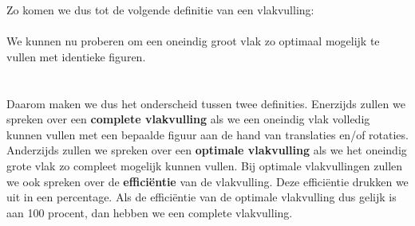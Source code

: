 Zo komen we dus tot de volgende definitie van een vlakvulling:\\
\\
We kunnen nu proberen om een oneindig groot vlak zo optimaal mogelijk te vullen met identieke figuren.\\
\\
\\
Daarom maken we dus het onderscheid tussen twee definities. Enerzijds zullen we spreken over een \textbf{complete vlakvulling} als we een oneindig vlak volledig kunnen vullen met een bepaalde figuur aan de hand van translaties en/of rotaties. Anderzijds zullen we spreken over een \textbf{optimale vlakvulling} als we het oneindig grote vlak zo compleet mogelijk kunnen vullen. Bij optimale vlakvullingen zullen we ook spreken over de \textbf{effici\"{e}ntie} van de vlakvulling. Deze effici\"{e}ntie drukken we uit in een percentage. Als de effici\"{e}ntie van de optimale vlakvulling dus gelijk is aan 100 procent, dan hebben we een complete vlakvulling.
